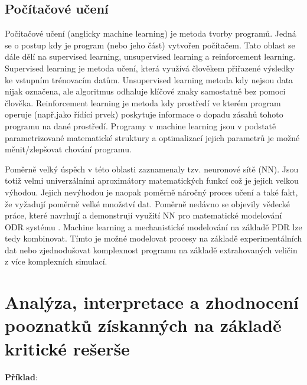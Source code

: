 \section{Počítačové učení}
\label{sec:ML}
Počítačové učení (anglicky machine learning) je metoda tvorby programů. Jedná
se o postup kdy je program (nebo jeho část) vytvořen počítačem. Tato oblast se
dále dělí na supervised learning, unsupervised learning a reinforcement
learning. Supervised learning je metoda učení, která využívá člověkem přiřazené
výsledky ke vstupním trénovacím datům. Unsupervised learning metoda kdy nejsou
data nijak označena, ale algoritmus odhaluje klíčové znaky samostatně bez
pomoci člověka. Reinforcement learning je metoda kdy prostředí ve kterém
program operuje (např.jako řídící prvek) poskytuje informace o dopadu zásahů
tohoto programu na dané prostředí. Programy v machine learning jsou v podstatě
parametrizované matematické struktury a optimalizací jejich parametrů je možné
měnit/zlepšovat chování programu.

Poměrně velký úspěch v této oblasti zaznamenaly tzv. neuronové sítě (NN). Jsou
totiž velmi univerzálními aproximátory matematických funkcí což je jejich
velkou výhodou. Jejich nevýhodou je naopak poměrně náročný proces učení a také
fakt, že vyžadují poměrně velké množství dat. Poměrně nedávno se objevily
vědecké práce, které navrhují a demonstrují využití NN pro matematické
modelování ODR systému \cite{diffEqFlux2019, chen2018neural}. Machine
learning a mechanistické modelování na základě PDR lze tedy kombinovat. Tímto
je možné modelovat procesy na základě experimentálních dat nebo zjednodušovat
komplexnost programu na základě extrahovaných veličin z více komplexních
simulací.
\chapter{Analýza, interpretace a zhodnocení pooznatků získanných na základě
kritické rešerše}
\textbf{Příklad}:
